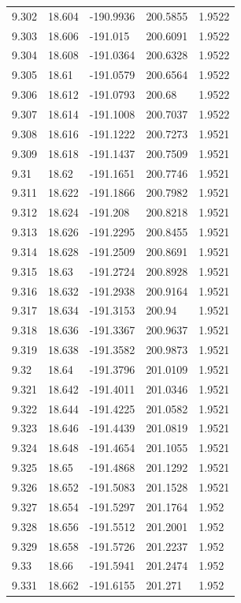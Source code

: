 \begin{tabular}{lllll}
9.302 & 18.604 & -190.9936 & 200.5855 & 1.9522 \\
9.303 & 18.606 & -191.015 & 200.6091 & 1.9522 \\
9.304 & 18.608 & -191.0364 & 200.6328 & 1.9522 \\
9.305 & 18.61 & -191.0579 & 200.6564 & 1.9522 \\
9.306 & 18.612 & -191.0793 & 200.68 & 1.9522 \\
9.307 & 18.614 & -191.1008 & 200.7037 & 1.9522 \\
9.308 & 18.616 & -191.1222 & 200.7273 & 1.9521 \\
9.309 & 18.618 & -191.1437 & 200.7509 & 1.9521 \\
9.31 & 18.62 & -191.1651 & 200.7746 & 1.9521 \\
9.311 & 18.622 & -191.1866 & 200.7982 & 1.9521 \\
9.312 & 18.624 & -191.208 & 200.8218 & 1.9521 \\
9.313 & 18.626 & -191.2295 & 200.8455 & 1.9521 \\
9.314 & 18.628 & -191.2509 & 200.8691 & 1.9521 \\
9.315 & 18.63 & -191.2724 & 200.8928 & 1.9521 \\
9.316 & 18.632 & -191.2938 & 200.9164 & 1.9521 \\
9.317 & 18.634 & -191.3153 & 200.94 & 1.9521 \\
9.318 & 18.636 & -191.3367 & 200.9637 & 1.9521 \\
9.319 & 18.638 & -191.3582 & 200.9873 & 1.9521 \\
9.32 & 18.64 & -191.3796 & 201.0109 & 1.9521 \\
9.321 & 18.642 & -191.4011 & 201.0346 & 1.9521 \\
9.322 & 18.644 & -191.4225 & 201.0582 & 1.9521 \\
9.323 & 18.646 & -191.4439 & 201.0819 & 1.9521 \\
9.324 & 18.648 & -191.4654 & 201.1055 & 1.9521 \\
9.325 & 18.65 & -191.4868 & 201.1292 & 1.9521 \\
9.326 & 18.652 & -191.5083 & 201.1528 & 1.9521 \\
9.327 & 18.654 & -191.5297 & 201.1764 & 1.952 \\
9.328 & 18.656 & -191.5512 & 201.2001 & 1.952 \\
9.329 & 18.658 & -191.5726 & 201.2237 & 1.952 \\
9.33 & 18.66 & -191.5941 & 201.2474 & 1.952 \\
9.331 & 18.662 & -191.6155 & 201.271 & 1.952 \\

\end{tabular}
